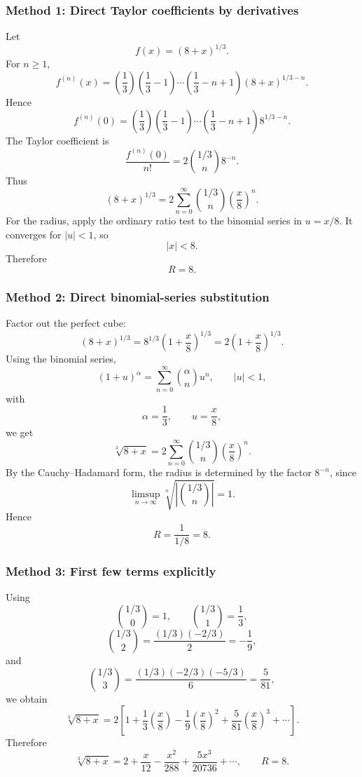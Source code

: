 \documentclass[12pt]{article}
\begin{document}
\subsubsection{Method 1: Direct Taylor coefficients by derivatives}

Let
\[
f(x)=(8+x)^{1/3}.
\]
For \(n\ge1\),
\[
f^{(n)}(x)
=
\left(\frac13\right)\left(\frac13-1\right)\cdots
\left(\frac13-n+1\right)(8+x)^{1/3-n}.
\]
Hence
\[
f^{(n)}(0)
=
\left(\frac13\right)\left(\frac13-1\right)\cdots
\left(\frac13-n+1\right)8^{1/3-n}.
\]
The Taylor coefficient is
\[
\frac{f^{(n)}(0)}{n!}
=
2\binom{1/3}{n}8^{-n}.
\]
Thus
\[
\boxed{
(8+x)^{1/3}
=
2\sum_{n=0}^{\infty}\binom{1/3}{n}\left(\frac{x}{8}\right)^n.
}
\]
For the radius, apply the ordinary ratio test to the binomial series in \(u=x/8\).
It converges for \(|u|<1\), so
\[
|x|<8.
\]
Therefore
\[
\boxed{R=8.}
\]

\newpage
\subsubsection{Method 2: Direct binomial-series substitution}

Factor out the perfect cube:
\[
(8+x)^{1/3}
=
8^{1/3}\left(1+\frac{x}{8}\right)^{1/3}
=
2\left(1+\frac{x}{8}\right)^{1/3}.
\]
Using the binomial series,
\[
(1+u)^\alpha
=
\sum_{n=0}^{\infty}\binom{\alpha}{n}u^n,
\qquad |u|<1,
\]
with
\[
\alpha=\frac13,\qquad u=\frac{x}{8},
\]
we get
\[
\boxed{
\sqrt[3]{8+x}
=
2\sum_{n=0}^{\infty}\binom{1/3}{n}\left(\frac{x}{8}\right)^n.
}
\]
By the Cauchy--Hadamard form, the radius is determined by the factor \(8^{-n}\), since
\[
\limsup_{n\to\infty}
\sqrt[n]{\left|\binom{1/3}{n}\right|}
=
1.
\]
Hence
\[
R=\frac{1}{1/8}
=
\boxed{8.}
\]

\newpage

\subsubsection{Method 3: First few terms explicitly}

Using
\[
\binom{1/3}{0}=1,
\qquad
\binom{1/3}{1}=\frac13,
\]
\[
\binom{1/3}{2}
=
\frac{(1/3)(-2/3)}{2}
=
-\frac19,
\]
and
\[
\binom{1/3}{3}
=
\frac{(1/3)(-2/3)(-5/3)}{6}
=
\frac{5}{81},
\]
we obtain
\[
\sqrt[3]{8+x}
=
2\left[
1+\frac13\left(\frac{x}{8}\right)
-\frac19\left(\frac{x}{8}\right)^2
+\frac{5}{81}\left(\frac{x}{8}\right)^3
+\cdots
\right].
\]
Therefore
\[
\boxed{
\sqrt[3]{8+x}
=
2+\frac{x}{12}-\frac{x^2}{288}+\frac{5x^3}{20736}+\cdots,
\qquad R=8.
}
\]
\end{document}
